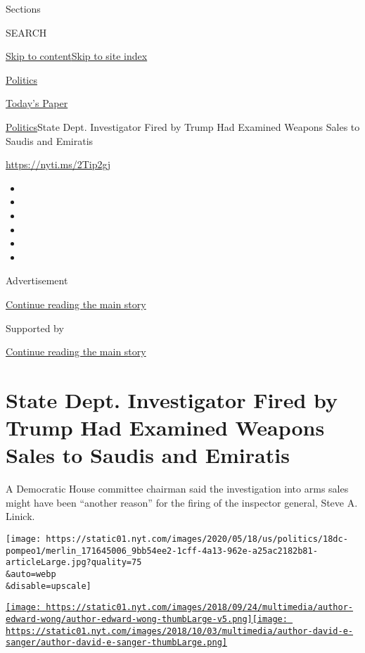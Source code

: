 Sections

SEARCH

\protect\hyperlink{site-content}{Skip to
content}\protect\hyperlink{site-index}{Skip to site index}

\href{https://www.nytimes.com/section/politics}{Politics}

\href{https://myaccount.nytimes.com/auth/login?response_type=cookie\&client_id=vi}{}

\href{https://www.nytimes.com/section/todayspaper}{Today's Paper}

\href{/section/politics}{Politics}\textbar{}State Dept. Investigator
Fired by Trump Had Examined Weapons Sales to Saudis and Emiratis

\url{https://nyti.ms/2Tip2gj}

\begin{itemize}
\item
\item
\item
\item
\item
\item
\end{itemize}

Advertisement

\protect\hyperlink{after-top}{Continue reading the main story}

Supported by

\protect\hyperlink{after-sponsor}{Continue reading the main story}

\hypertarget{state-dept-investigator-fired-by-trump-had-examined-weapons-sales-to-saudis-and-emiratis}{%
\section{State Dept. Investigator Fired by Trump Had Examined Weapons
Sales to Saudis and
Emiratis}\label{state-dept-investigator-fired-by-trump-had-examined-weapons-sales-to-saudis-and-emiratis}}

A Democratic House committee chairman said the investigation into arms
sales might have been ``another reason'' for the firing of the inspector
general, Steve A. Linick.

\texttt{[image: https://static01.nyt.com/images/2020/05/18/us/politics/18dc-pompeo1/merlin\_171645006\_9bb54ee2-1cff-4a13-962e-a25ac2182b81-articleLarge.jpg?quality=75\\\&auto=webp\\\&disable=upscale]}

\href{https://www.nytimes.com/by/edward-wong}{\texttt{[image: https://static01.nyt.com/images/2018/09/24/multimedia/author-edward-wong/author-edward-wong-thumbLarge-v5.png]}}\href{https://www.nytimes.com/by/david-e-sanger}{\texttt{[image: https://static01.nyt.com/images/2018/10/03/multimedia/author-david-e-sanger/author-david-e-sanger-thumbLarge.png]}}

